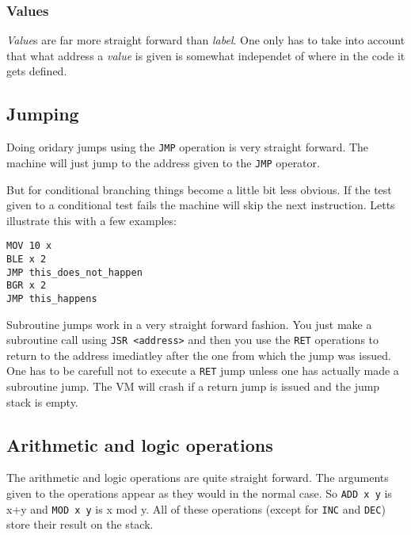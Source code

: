\documentclass{article}
\newcommand{\V}{\verb}
\begin{document}
\subsubsection{Values}
\emph{Value}s are far more straight forward than \emph{label}. One only has to
take into account that what address a \emph{value} is given is somewhat
independet of where in the code it gets defined.

\subsection{Jumping}
Doing oridary jumps using the \V+JMP+ operation is very straight forward. The
machine will just jump to the address given to the \V+JMP+ operator.

But for conditional branching things become a little bit less obvious. If the
test given to a conditional test fails the machine will skip the next
instruction. Letts illustrate this with a few examples:
\begin{verbatim}
MOV 10 x
BLE x 2
JMP this_does_not_happen
BGR x 2
JMP this_happens
\end{verbatim}

Subroutine jumps work in a very straight forward fashion. You just make a
subroutine call using \V+JSR <address>+ and then you use the \V+RET+ operations
to return to the address imediatley after the one from which the jump was
issued. One has to be carefull not to execute a \V+RET+ jump unless one has
actually made a subroutine jump. The VM will crash if a return jump is issued
and the jump stack is empty.

\subsection{Arithmetic and logic operations}
The arithmetic and logic operations are quite straight forward. The arguments
given to the operations appear as they would in the normal case. So \V+ADD x y+
is x+y and \V+MOD x y+ is x mod y. All of these operations (except for \V+INC+
and \V+DEC+) store their result on the stack.
\end{document}
